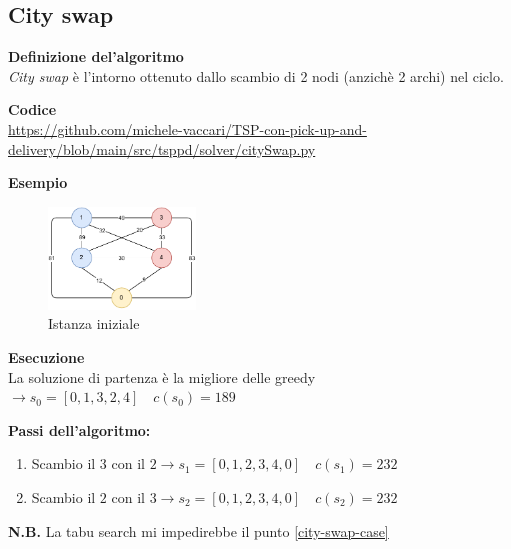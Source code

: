 \documentclass[9pt]{beamer}
\begin{document}
\subsection{City swap}
\begin{frame}{\subsecname}
	\textbf{Definizione del'algoritmo} \\
	\emph{City swap} è l’intorno ottenuto dallo scambio di 2 nodi (anzichè 2 archi) nel ciclo.

	\textbf{Codice} \\
	\href{https://github.com/michele-vaccari/TSP-con-pick-up-and-delivery/blob/main/src/tsppd/solver/citySwap.py}{https://github.com/michele-vaccari/TSP-con-pick-up-and-delivery/blob/main/src/tsppd/solver/citySwap.py}

	\textbf{Esempio}
	\begin{figure}[h]
	\centering
	\includegraphics[width=0.35\textwidth]
	{../images/graph-tsppd-with-two-customers}	
	\caption{Istanza iniziale}
	\end{figure}

\framebreak
	{\footnotesize
	\textbf{Esecuzione} \\
	La soluzione di partenza è la migliore delle greedy $\rightarrow s_0 = [0,1,3,2,4] \quad c(s_0) = 189$

	\textbf{Passi dell’algoritmo:}
	\begin{enumerate}
		\item
		Scambio il $3$ con il $2 \rightarrow s_1 = [0,1,2,3,4,0] \quad c(s_1) = 232$

		\item
		\label{city-swap-case}
		Scambio il $2$ con il $3 \rightarrow s_2 = [0,1,2,3,4,0] \quad c(s_2) = 232$
	\end{enumerate}
	\textbf{N.B.} La tabu search mi impedirebbe il punto \ref{city-swap-case}

	\captionsetup{justification=centering,font=footnotesize}

}
\end{frame}
\end{document}
